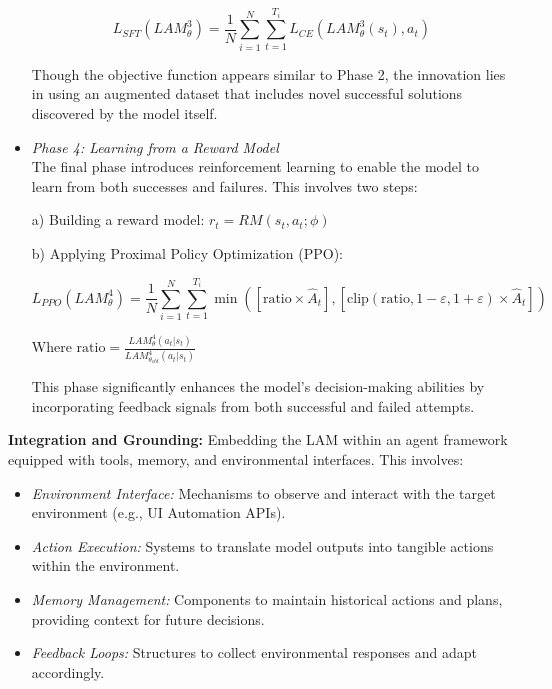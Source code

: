 \documentclass[journal,twoside,10pt]{IEEEtran}
\begin{document}
\begin{itemize}
    \begin{equation}
    L_{SFT}(LAM^3_{\theta}) = \frac{1}{N} \sum_{i=1}^{N} \sum_{t=1}^{T_i} L_{CE}(LAM^3_{\theta}(s_t), a_t)
    \end{equation}
    
    Though the objective function appears similar to Phase 2, the innovation lies in using an augmented dataset that includes novel successful solutions discovered by the model itself.
    
    \item \textit{Phase 4: Learning from a Reward Model}\\
    The final phase introduces reinforcement learning to enable the model to learn from both successes and failures. This involves two steps:
    
    a) Building a reward model: $r_t = RM(s_t, a_t; \phi)$
    
    b) Applying Proximal Policy Optimization (PPO):
    
    \begin{equation}
    L_{PPO}(LAM^4_{\theta}) = \frac{1}{N} \sum_{i=1}^{N} \sum_{t=1}^{T_i} \min\left( \left[\text{ratio} \times \hat{A}_t\right], \left[\text{clip}(\text{ratio}, 1-\varepsilon, 1+\varepsilon) \times \hat{A}_t\right] \right)
    \end{equation}
    
    Where $\text{ratio} = \frac{LAM^4_{\theta}(a_t|s_t)}{LAM^4_{\theta_{old}}(a_t|s_t)}$
    
    This phase significantly enhances the model's decision-making abilities by incorporating feedback signals from both successful and failed attempts.
\end{itemize}

\textbf{Integration and Grounding:} Embedding the LAM within an agent framework equipped with tools, memory, and environmental interfaces. This involves:
\begin{itemize}
    \item \textit{Environment Interface:} Mechanisms to observe and interact with the target environment (e.g., UI Automation APIs).
    \item \textit{Action Execution:} Systems to translate model outputs into tangible actions within the environment.
    \item \textit{Memory Management:} Components to maintain historical actions and plans, providing context for future decisions.
    \item \textit{Feedback Loops:} Structures to collect environmental responses and adapt accordingly.
\end{itemize}
\end{document}

